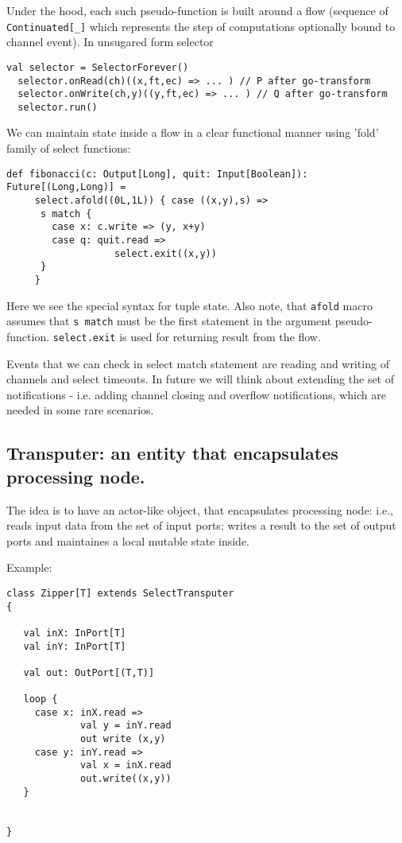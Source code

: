 \documentclass[12pt]{article}
\begin{document}
  Under the hood, each such pseudo-function is built around a flow (sequence of \verb|Continuated[_]| which represents the step of computations optionally bound to channel event).  In unsugared form selector 

\begin{Verbatim}[fontsize=\small]
  val selector = SelectorForever()
  selector.onRead(ch)((x,ft,ec) => ... ) // P after go-transform
  selector.onWrite(ch,y)((y,ft,ec) => ... ) // Q after go-transform
  selector.run()
\end{Verbatim}

 We can maintain state inside a flow in a clear functional manner  using 'fold' family of select functions:

\begin{Verbatim}[fontsize=\small]
  def fibonacci(c: Output[Long], quit: Input[Boolean]): Future[(Long,Long)] =
     select.afold((0L,1L)) { case ((x,y),s) =>
      s match {
        case x: c.write => (y, x+y)
        case q: quit.read =>
                   select.exit((x,y))
      }
     }
\end{Verbatim}

  Here we see the special syntax for tuple state. Also note, that \verb|afold| macro assumes that \verb|s match| must be the first statement in the argument pseudo-function. \verb|select.exit| is used for returning result from the flow.
 
  Events that we can check in select match statement are reading and writing of channels and select timeouts. In future we will think about extending the set of notifications - i.e. adding channel closing and overflow notifications, which are needed in some rare scenarios.

\subsection{Transputer: an entity that encapsulates processing node. }

 The idea is to have an actor-like object, that encapsulates processing node: i.e., reads input data 
from the set of input ports; writes a result to the set of output ports and maintaines a local 
mutable state inside.

Example:

\begin{Verbatim}[fontsize=\small]
class Zipper[T] extends SelectTransputer
{
 
   val inX: InPort[T]
   val inY: InPort[T]

   val out: OutPort[(T,T)] 

   loop {
     case x: inX.read => 
             val y = inY.read
             out write (x,y)
     case y: inY.read =>
             val x = inX.read
             out.write((x,y)) 
   }


}
\end{Verbatim}
\end{document}
